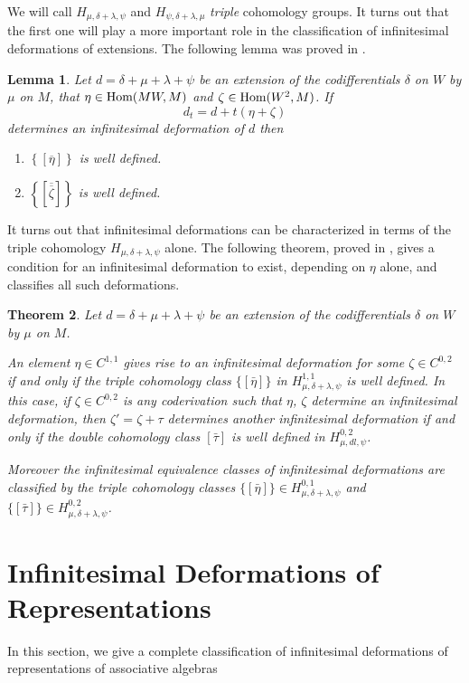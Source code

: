 \documentclass[12pt]{amsart}
\newtheorem{thm}{Theorem}[section]
\newtheorem{lma}[thm]{Lemma}
\theoremstyle{definition}
\begin{document}
We will call $H_{\mu,\delta+\lambda,\psi}$ and
$H_{\psi,\delta+\lambda,\mu}$ \emph{triple} cohomology groups. It
turns out that the first one will play a more important role in the
classification of infinitesimal deformations of extensions. The
following lemma was proved in \cite{fp9}.
\begin{lma}\label{eta-zeta}
Let $d=\delta+\mu+\lambda+\psi$ be an extension of the
codifferentials $\delta$ on $W$ by $\mu$ on $M$, that
$\eta\in{\mbox{\rm Hom}}(MW,M)$ and $\zeta\in{\mbox{\rm Hom}}(W^2,M)$. If
$$d_t=d+t(\eta+\zeta)$$
determines an infinitesimal deformation of $d$ then
\begin{enumerate}
\item ${\left\{{\left[\overline{{\eta}}\right]}\right\}}$ is well defined.
\item ${\left\{{\left[\overline{\overline{{\zeta}}}\right]}\right\}}$ is well defined.
\end{enumerate}
\end{lma}
It turns out that infinitesimal deformations can be characterized in
terms of the triple cohomology $H_{\mu,{\delta+\lambda},\psi}$ alone. The
following theorem, proved in \cite{fp9}, gives a condition for an
infinitesimal deformation to exist, depending on $\eta$ alone, and
classifies all such deformations.

\begin{thm}\label{th8}
Let $d=\delta+\mu+\lambda+\psi$ be an extension of the
codifferentials $\delta$ on $W$ by $\mu$ on $M$.

An element $\eta\in C^{1,1}$ gives rise to an
infinitesimal deformation for some $\zeta\in C^{0,2}$
if and only if the triple cohomology class $\{[\bar\eta]\}$ in $H_{\mu,{\delta+\lambda},\psi}^{1,1}$ is well defined.
In this case, if $\zeta\in C^{0,2}$ is
any coderivation such that $\eta$, $\zeta$ determine an infinitesimal deformation, then
$\zeta'=\zeta+\tau$ determines another infinitesimal deformation if and only if the double cohomology
class $[\bar\tau]$ is well defined in $H_{\mu,dl,\psi}^{0,2}$.

Moreover the infinitesimal equivalence classes of infinitesimal deformations are classified by
the triple cohomology
classes $\{[\bar\eta]\}\in H_{\mu,{\delta+\lambda},\psi}^{0,1}$ and $\{[\bar\tau]\}\in H_{\mu,{\delta+\lambda},\psi}^{0,2}$.
\end{thm}

\section{Infinitesimal Deformations of Representations}\label{sec10}
In this section, we give a complete classification of infinitesimal
deformations of representations of associative algebras
\end{document}
